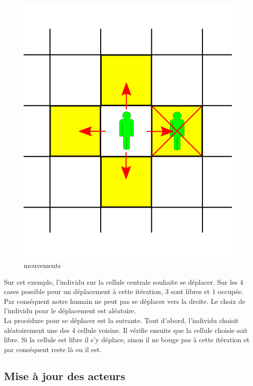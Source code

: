 \begin{figure}[h]
\centering
\captionsetup{justification=centering}
\includegraphics[scale=0.5]{Images/move_available.png}
\caption{mouvements}
\end{figure}

Sur cet exemple, l'individu sur la cellule centrale souhaite se déplacer. Sur les $4$ cases possible pour un déplacement à cette itération, $3$ sont libres et $1$ occupée. Par conséquent notre humain ne peut pas se déplacer vers la droite. Le choix de l'individu pour le déplacement est aléatoire.\\

La procédure pour se déplacer est la suivante. Tout d'abord, l'individu choisit aléatoirement une des $4$ cellule voisine. Il vérifie ensuite que la cellule choisie soit libre. Si la cellule est libre il s'y déplace, sinon il ne bouge pas à cette itération et par conséquent reste là ou il est.

\subsection{Mise à jour des acteurs}

